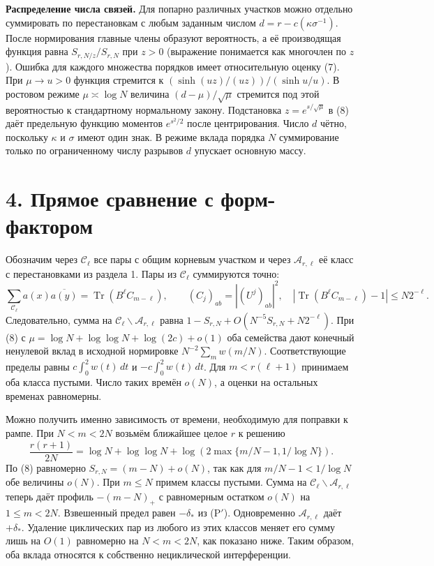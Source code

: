 \documentclass[11pt,a4paper]{article}
\newcommand{\Tr}{\operatorname{Tr}}
\newcommand{\sect}[1]{\section*{\sffamily\color{ink}#1}}
\newcommand{\subt}[1]{\par\medskip\noindent\textbf{#1.}\quad}
\begin{document}
\subt{Распределение числа связей} Для попарно различных участков можно отдельно суммировать по перестановкам с любым заданным числом $d=r-c(\kappa\sigma^{-1})$. После нормирования главные члены образуют вероятность, а её производящая функция равна $S_{r,N/z}/S_{r,N}$ при $z>0$ (выражение понимается как многочлен по $z$). Ошибка для каждого множества порядков имеет относительную оценку (7). При $\mu\to u>0$ функция стремится к $(\sinh(uz)/(uz))/(\sinh u/u)$. В ростовом режиме $\mu\asymp\log N$ величина $(d-\mu)/\sqrt\mu$ стремится под этой вероятностью к стандартному нормальному закону. Подстановка $z=e^{s/\sqrt\mu}$ в (8) даёт предельную функцию моментов $e^{s^2/2}$ после центрирования. Число $d$ чётно, поскольку $\kappa$ и $\sigma$ имеют один знак. В режиме вклада порядка $N$ суммирование только по ограниченному числу разрывов $d$ упускает основную массу.
\newpage
\sect{4. Прямое сравнение с форм-фактором}
Обозначим через $\mathcal C_{\ell}$ все пары с общим корневым участком и через $\mathcal A_{r,\ell}$ её класс с перестановками из раздела 1. Пары из $\mathcal C_{\ell}$ суммируются точно:
\[
       \sum_{\mathcal C_{\ell}} a(x)\overline{a(y)}
             =\Tr (B^\ell C_{m-\ell}),\qquad
       (C_j)_{ab}=|(U^j)_{ab}|^2,\quad
       |\Tr (B^\ell C_{m-\ell})-1|\le N2^{-\ell}.
\]
Следовательно, сумма на $\mathcal C_\ell\smallsetminus\mathcal A_{r,\ell}$ равна $1-S_{r,N}+O(N^{-5}S_{r,N}+N2^{-\ell})$. При (8) с $\mu=\log N+\log\log N+\log(2c)+o(1)$ оба семейства дают конечный ненулевой вклад в исходной нормировке $N^{-2}\sum_m w(m/N)$. Соответствующие пределы равны $c\int_0^2 w(t)\,dt$ и $-c\int_0^2 w(t)\,dt$. Для $m<r(\ell+1)$ принимаем оба класса пустыми. Число таких времён $o(N)$, а оценки на остальных временах равномерны.

Можно получить именно зависимость от времени, необходимую для поправки к рампе. При $N<m<2N$ возьмём ближайшее целое $r$ к решению
\[
  \frac{r(r+1)}{2N}
      =\log N+\log\log N+\log\!\left(2\max\{m/N-1,1/\log N\}\right).
\]
По (8) равномерно $S_{r,N}=(m-N)+o(N)$, так как для $m/N-1<1/\log N$ обе величины $o(N)$. При $m\le N$ примем классы пустыми. Сумма на $\mathcal C_\ell\smallsetminus\mathcal A_{r,\ell}$ теперь даёт профиль $-(m-N)_+$ с равномерным остатком $o(N)$ на $1\le m<2N$. Взвешенный предел равен $-\delta_*$ из (P$'$). Одновременно $\mathcal A_{r,\ell}$ даёт $+\delta_*$. Удаление циклических пар из любого из этих классов меняет его сумму лишь на $O(1)$ равномерно на $N<m<2N$, как показано ниже. Таким образом, оба вклада относятся к собственно нециклической интерференции.
\end{document}
